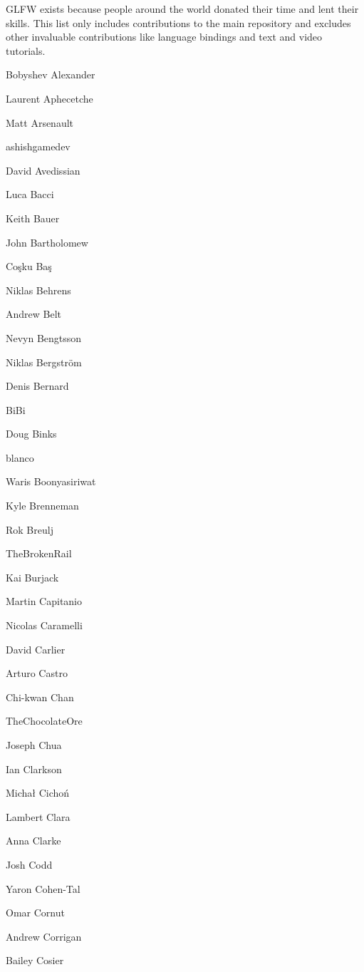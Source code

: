 GLFW exists because people around the world donated their time and lent their skills. This list only includes contributions to the main repository and excludes other invaluable contributions like language bindings and text and video tutorials.


\begin{DoxyItemize}
\item Bobyshev Alexander
\item Laurent Aphecetche
\item Matt Arsenault
\item ashishgamedev
\item David Avedissian
\item Luca Bacci
\item Keith Bauer
\item John Bartholomew
\item Coşku Baş
\item Niklas Behrens
\item Andrew Belt
\item Nevyn Bengtsson
\item Niklas Bergström
\item Denis Bernard
\item Bi\+Bi
\item Doug Binks
\item blanco
\item Waris Boonyasiriwat
\item Kyle Brenneman
\item Rok Breulj
\item The\+Broken\+Rail
\item Kai Burjack
\item Martin Capitanio
\item Nicolas Caramelli
\item David Carlier
\item Arturo Castro
\item Chi-\/kwan Chan
\item The\+Chocolate\+Ore
\item Joseph Chua
\item Ian Clarkson
\item Michał Cichoń
\item Lambert Clara
\item Anna Clarke
\item Josh Codd
\item Yaron Cohen-\/\+Tal
\item Omar Cornut
\item Andrew Corrigan
\item Bailey Cosier

\end{DoxyItemize}
